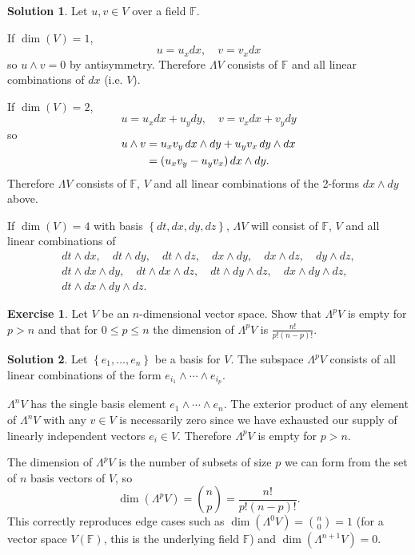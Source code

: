 \documentclass[11pt, a4paper]{report}
\theoremstyle{definition}
\newtheorem{ex}{Exercise}[part]
\newtheorem{sol}{Solution}[part]
\renewcommand{\leq}{\leqslant}
\begin{document}
\begin{sol}

Let $u, v \in V$ over a field $\mathbb{F}$.

If $\dim(V) = 1$,
\[
    u = u_x dx, \quad v = v_x dx
\]
so $u \wedge v = 0$ by antisymmetry. Therefore $\Lambda V$ consists of $\mathbb{F}$ and all linear combinations of $dx$ (i.e. $V$).

If $\dim(V) = 2$,
\[
    u = u_x dx + u_y dy, \quad v = v_x dx + v_y dy
\]
so
\begin{align*}
    \SwapAboveDisplaySkip
    u \wedge v &= u_x v_y \, dx \wedge dy + u_y v_x \, dy \wedge dx \\
               &= (u_x v_y - u_y v_x) \, dx \wedge dy.
\end{align*}
Therefore $\Lambda V$ consists of $\mathbb{F}$, $V$ and all linear combinations of the 2-forms $dx \wedge dy$ above.

If $\dim(V) = 4$ with basis $\left\{dt, dx, dy, dz\right\}$, $\Lambda V$ will consist of $\mathbb{F}$, $V$ and all linear combinations of
\begin{gather*}
    dt \wedge dx, \quad
    dt \wedge dy, \quad
    dt \wedge dz, \quad
    dx \wedge dy, \quad
    dx \wedge dz, \quad
    dy \wedge dz, \\
    dt \wedge dx \wedge dy, \quad
    dt \wedge dx \wedge dz, \quad
    dt \wedge dy \wedge dz, \quad
    dx \wedge dy \wedge dz, \\
    dt \wedge dx \wedge dy \wedge dz.
\end{gather*}

\end{sol}

\begin{ex}

Let $V$ be an $n$-dimensional vector space. Show that $\Lambda^p V$ is empty for $p > n$ and that for $0 \leq p \leq n$ the dimension of $\Lambda^p V$ is $\frac{n!}{p! (n - p)!}$.

\end{ex}

\begin{sol}

Let $\left\{e_1, \ldots, e_n\right\}$ be a basis for $V$.
The subspace $\Lambda^p V$ consists of all linear combinations of the form $e_{i_1} \wedge \cdots \wedge e_{i_p}$.

$\Lambda^n V$ has the single basis element $e_1 \wedge \cdots \wedge e_n$.
The exterior product of any element of $\Lambda^n V$ with any $v \in V$ is necessarily zero since we have exhausted our supply of linearly independent vectors $e_i \in V$. Therefore $\Lambda^p V$ is empty for $p > n$.

The dimension of $\Lambda^p V$ is the number of subsets of size $p$ we can form from the set of $n$ basis vectors of $V$, so
\[
    \dim(\Lambda^p V) = \binom{n}{p} = \frac{n!}{p! (n - p)!}.
\]
This correctly reproduces edge cases such as $\dim(\Lambda^0 V) = \binom{n}{0} = 1$ (for a vector space $V(\mathbb{F})$, this is the underlying field $\mathbb{F}$) and $\dim(\Lambda^{n+1}V) = 0$.

\end{sol}
\end{document}
